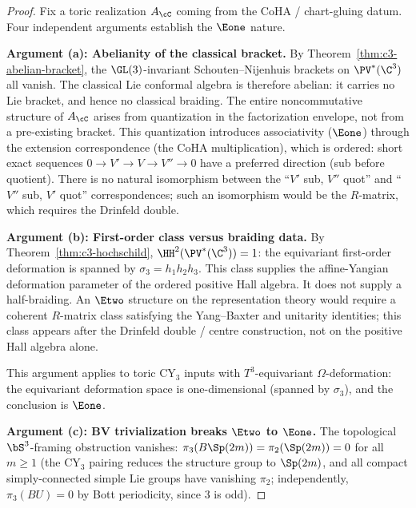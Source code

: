 \begin{proof}
Fix a toric realization $A_\cC$ coming from the CoHA / chart-gluing datum. Four independent arguments establish the $\Eone$ nature.

\medskip
\noindent\textbf{Argument (a): Abelianity of the classical bracket.}
By Theorem~\ref{thm:c3-abelian-bracket}, the $\GL(3)$-invariant Schouten--Nijenhuis brackets on $\PV^*(\C^3)$ all vanish. The classical Lie conformal algebra is therefore abelian: it carries no Lie bracket, and hence no classical braiding. The entire noncommutative structure of $A_\cC$ arises from quantization in the factorization envelope, not from a pre-existing bracket. This quantization introduces associativity ($\Eone$) through the extension correspondence (the CoHA multiplication), which is ordered: short exact sequences $0 \to V' \to V \to V'' \to 0$ have a preferred direction (sub before quotient). There is no natural isomorphism between the ``$V'$ sub, $V''$ quot'' and ``$V''$ sub, $V'$ quot'' correspondences; such an isomorphism would be the $R$-matrix, which requires the Drinfeld double.

\medskip
\noindent\textbf{Argument (b): First-order class versus braiding data.}
By Theorem~\ref{thm:c3-hochschild}, $\HH^2(\PV^*(\C^3)) = 1$: the equivariant first-order deformation is spanned by $\sigma_3 = h_1 h_2 h_3$. This class supplies the affine-Yangian deformation parameter of the ordered positive Hall algebra. It does not supply a half-braiding. An $\Etwo$ structure on the representation theory would require a coherent $R$-matrix class satisfying the Yang--Baxter and unitarity identities; this class appears after the Drinfeld double / centre construction, not on the positive Hall algebra alone.

This argument applies to toric CY$_3$ inputs with $T^3$-equivariant
$\Omega$-deformation: the equivariant deformation space is
one-dimensional (spanned by $\sigma_3$), and the conclusion is $\Eone$.

\medskip
\noindent\textbf{Argument (c): BV trivialization breaks $\Etwo$ to $\Eone$.}
The topological $\bS^3$-framing obstruction vanishes: $\pi_3(B\Sp(2m)) = \pi_2(\Sp(2m)) = 0$ for all $m \geq 1$ (the CY$_3$ pairing reduces the structure group to $\Sp(2m)$, and all compact simply-connected simple Lie groups have vanishing $\pi_2$; independently, $\pi_3(BU) = 0$ by Bott periodicity, since $3$ is odd).


\end{proof}
